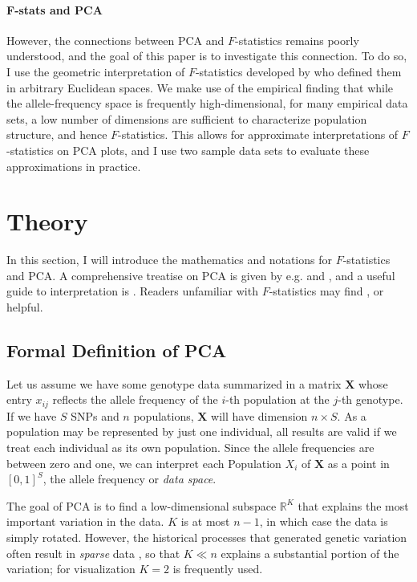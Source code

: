 \documentclass[12pt,fullpage, a4paper]{article}
\newcommand{\MX}{\mathbf{X}} %
\begin{document}
\paragraph{F-stats and PCA}
However, the connections between PCA and $F$-statistics remains poorly understood, and the goal of this paper is to investigate this connection. To do so, I use the geometric interpretation of $F$-statistics developed by \cite{oteo-garcia2021} who defined them in arbitrary Euclidean spaces. We make use of the empirical finding that while the allele-frequency space is frequently high-dimensional, for many empirical data sets, a low number of dimensions are sufficient to characterize population structure, and hence $F$-statistics. This allows for approximate interpretations of $F$-statistics on PCA plots, and I use two sample data sets to evaluate these approximations in practice. 

	
\section{Theory}
In this section, I will introduce the mathematics and notations for $F$-statistics and PCA. A comprehensive  treatise on PCA is given by e.g. \cite{jolliffe2013} and \cite{pachter2014}, and a useful guide to interpretation is \cite{cavalli-sforza1994}. Readers unfamiliar with $F$-statistics may find \cite{patterson2012}, \cite{peter2016} or \cite{oteo-garcia2021} helpful.

\subsection{Formal Definition of PCA}
Let us assume we have some genotype data summarized in a matrix $\MX$ whose entry $x_{ij}$ reflects the allele frequency of the $i$-th population at the $j$-th genotype. If we have $S$ SNPs and $n$ populations, $\MX$ will have dimension $n \times S$. As a population may be represented by just one individual, all results are valid if we treat each individual as its own population. Since the allele
frequencies are between zero and one, we can interpret each Population $X_i$
of $\MX$ as a point in $[0, 1]^S$, the allele frequency or \emph{data space}.
	
The goal of PCA is to find a low-dimensional subspace $\mathbb{R}^K$ that explains the most important variation in the data. $K$ is at most $n-1$, in which case the data is simply rotated. However, the  historical processes that generated genetic variation often result in \emph{sparse} data \citep{engelhardt2010}, so that $K \ll n$ explains a substantial portion of the variation; for visualization $K=2$ is frequently used. 
	
\end{document}
